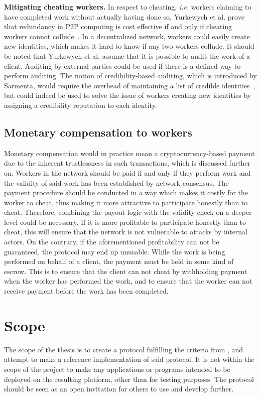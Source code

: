 \textbf{Mitigating cheating workers.}
In respect to cheating, \textit{i.e.} workers claiming to have completed work without actually having done so, Yurkewych et al. prove that redundancy in P2P computing is cost effective if and only if cheating workers cannot collude~\cite{yurkewych:2005}. In a decentralized network, workers could easily create new identities, which makes it hard to know if any two workers collude. It should be noted that Yurkewych et al. assume that it is possible to audit the work of a client. Auditing by external parties could be used if there is a defined way to perform auditing. The notion of credibility-based auditing, which is introduced by Sarmenta, would require the overhead of maintaining a list of credible identities~\cite{sarmenta:2002}, but could indeed be used to solve the issue of workers creating new identities by assigning a credibility reputation to each identity.

\subsection{Monetary compensation to workers}
\label{sec:prob:compensation}
Monetary compensation would in practice mean a cryptocurrency-based payment due to the inherent trustlessness in such transactions, which is discussed further on. Workers in the network should be paid if and only if they perform work and the validity of said work has been established by network consensus. The payment procedure should be conducted in a way which makes it costly for the worker to cheat, thus making it more attractive to participate honestly than to cheat. Therefore, combining the payout logic with the validity check on a deeper level could be necessary. If it is more profitable to participate honestly than to cheat, this will ensure that the network is not vulnerable to attacks by internal actors. On the contrary, if the aforementioned profitability can not be guaranteed, the protocol may end up unusable. While the work is being performed on behalf of a client, the payment must be held in some kind of escrow. This is to ensure that the client can not cheat by withholding payment when the worker has performed the work, and to ensure that the worker can not receive payment before the work has been completed.

\section{Scope}
The scope of the thesis is to create a protocol fulfilling the criteria from , and attempt to make a reference implementation of said protocol. It is not within the scope of the project to make any applications or programs intended to be deployed on the resulting platform, other than for testing purposes. The protocol should be seen as an open invitation for others to use and develop further.

